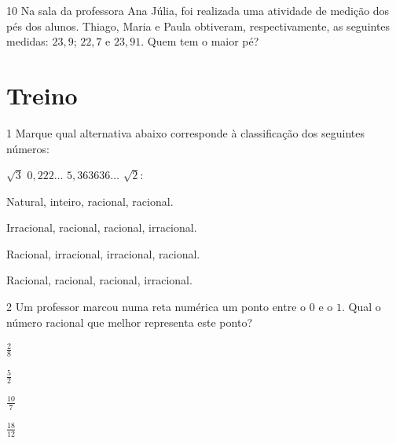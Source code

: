 \num{10} Na sala da professora Ana Júlia, foi realizada uma atividade de
medição dos pés dos alunos. Thiago, Maria e Paula obtiveram,
respectivamente, as seguintes medidas: $23,9$; $22,7$ e $23,91$. Quem tem o
maior pé?


\section*{Treino}

\num{1} Marque qual alternativa abaixo corresponde 
à classificação dos seguintes números:

\begin{myquote}
$\sqrt{3}$ \hfill $0,222\ldots{}$ \hfill  $5,363636\ldots{}$ \hfill  $\sqrt{2}$:
\end{myquote}

\begin{escolha}%
    \item Natural, inteiro, racional, racional.
    \item Irracional, racional, racional, irracional.
    \item Racional, irracional, irracional, racional.
    \item Racional, racional, racional, irracional.
\end{escolha}

\pagebreak


\num{2} Um professor marcou numa reta numérica um ponto entre o $0$ e o $1$. Qual
o número racional que melhor representa este ponto?

\begin{multicols}{4}
\begin{escolha}[itemsep=0pt]
    \item $\frac{2}{8}$
    \item $\frac{5}{2}$
    \item $\frac{10}{7}$
    \item $\frac{18}{12}$
\end{escolha}
\end{multicols}

